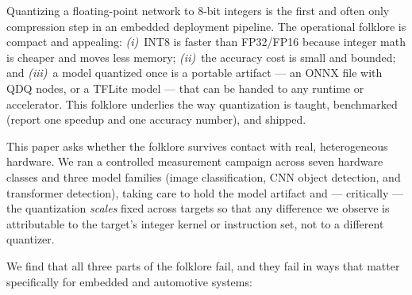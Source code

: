 \documentclass[11pt]{article}
\begin{document}
Quantizing a floating-point network to 8-bit integers is the first and often only compression step in an embedded deployment pipeline. The operational folklore is compact and appealing: \emph{(i)}~INT8 is faster than FP32/FP16 because integer math is cheaper and moves less memory; \emph{(ii)}~the accuracy cost is small and bounded; and \emph{(iii)}~a model quantized once is a portable artifact --- an ONNX file with QDQ nodes, or a TFLite model --- that can be handed to any runtime or accelerator. This folklore underlies the way quantization is taught, benchmarked (report one speedup and one accuracy number), and shipped.

This paper asks whether the folklore survives contact with real, heterogeneous hardware. We ran a controlled measurement campaign across seven hardware classes and three model families (image classification, CNN object detection, and transformer detection), taking care to hold the model artifact and --- critically --- the quantization \emph{scales} fixed across targets so that any difference we observe is attributable to the target's integer kernel or instruction set, not to a different quantizer.

We find that all three parts of the folklore fail, and they fail in ways that matter specifically for embedded and automotive systems:
\end{document}
